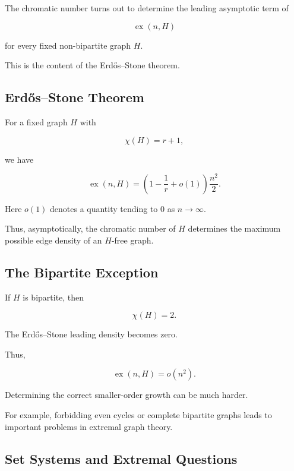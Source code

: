 The chromatic number turns out to determine the leading asymptotic term
of

\[
\operatorname{ex}(n,H)
\]

for every fixed non-bipartite graph \(H\).

This is the content of the Erd\H{o}s--Stone theorem.

\subsection{Erd\H{o}s--Stone Theorem}
\label{subsec:erdos-stone}

\begin{theorem}
For a fixed graph \(H\) with

\[
\chi(H)=r+1,
\]

we have

\[
\boxed{
\operatorname{ex}(n,H)
=
\left(
1-\frac1r+o(1)
\right)
\frac{n^2}{2}.
}
\]

Here \(o(1)\) denotes a quantity tending to \(0\) as \(n\to\infty\).
\end{theorem}

Thus, asymptotically, the chromatic number of \(H\) determines the
maximum possible edge density of an \(H\)-free graph.

\subsection{The Bipartite Exception}
\label{subsec:bipartite-extremal-exception}

If \(H\) is bipartite, then

\[
\chi(H)=2.
\]

The Erd\H{o}s--Stone leading density becomes zero.

Thus,

\[
\operatorname{ex}(n,H)=o(n^2).
\]

Determining the correct smaller-order growth can be much harder.

For example, forbidding even cycles or complete bipartite graphs leads
to important problems in extremal graph theory.

\subsection{Set Systems and Extremal Questions}
\label{subsec:set-systems-extremal}

